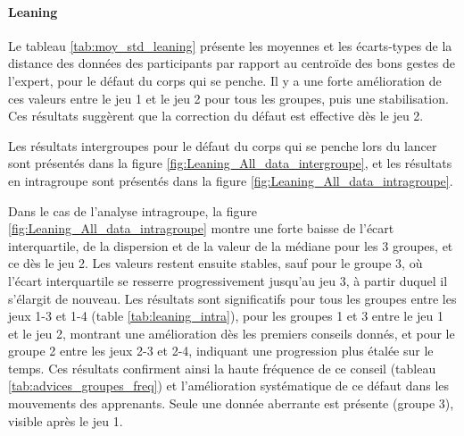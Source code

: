 \paragraph{Leaning}

Le tableau \ref{tab:moy_std_leaning} présente les moyennes et les écarts-types de la distance des données des participants par rapport au centroïde des bons gestes de l'expert, pour le défaut du corps qui se penche. Il y a une forte amélioration de ces valeurs entre le jeu 1 et le jeu 2 pour tous les groupes, puis une stabilisation. Ces résultats suggèrent que la correction du défaut est effective dès le jeu 2.

\begin{table}[H]
\small
{}
\caption{Moyennes et écarts-types des données des apprenants (corps penché).}
\label{tab:moy_std_leaning}
\end{table}

Les résultats intergroupes pour le défaut du corps qui se penche lors du lancer sont présentés dans la figure \ref{fig:Leaning_All_data_intergroupe}, et les résultats en intragroupe sont présentés dans la figure \ref{fig:Leaning_All_data_intragroupe}.

Dans le cas de l'analyse intragroupe, la figure \ref{fig:Leaning_All_data_intragroupe} montre une forte baisse de l'écart interquartile, de la dispersion et de la valeur de la médiane pour les 3 groupes, et ce dès le jeu 2. Les valeurs restent ensuite stables, sauf pour le groupe 3, où l'écart interquartile se resserre progressivement jusqu'au jeu 3, à partir duquel il s'élargit de nouveau. Les résultats sont significatifs pour tous les groupes entre les jeux 1-3 et 1-4 (table \ref{tab:leaning_intra}), pour les groupes 1 et 3 entre le jeu 1 et le jeu 2, montrant une amélioration dès les premiers conseils donnés, et pour le groupe 2 entre les jeux 2-3 et 2-4, indiquant une progression plus étalée sur le temps. Ces résultats confirment ainsi la haute fréquence de ce conseil (tableau \ref{tab:advices_groupes_freq}) et l'amélioration systématique de ce défaut dans les mouvements des apprenants. Seule une donnée aberrante est présente (groupe 3), visible après le jeu 1.

